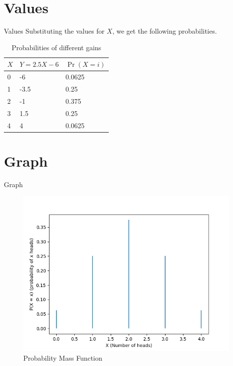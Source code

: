 \documentclass{beamer}
\providecommand{\pr}[1]{\ensuremath{\Pr\left(#1\right)}}
\begin{document}
\section{Values}
\begin{frame}{Values}
    Substituting the values for $X$, we get the following probabilities.


    \centering
    \begin{table}
    \begin{tabular}{|l|l|l|}
        \hline
        $X$ & $Y = 2.5 X - 6$ & $\pr{X = i}$ \\
        \hline
        0 & -6 & 0.0625 \\
        1 & -3.5 & 0.25 \\
        2 & -1 & 0.375 \\
        3 & 1.5 & 0.25 \\
        4 & 4 & 0.0625 \\
        \hline
    \end{tabular}
    \caption{Probabilities of different gains}
    \end{table}

\end{frame}

\section{Graph}
\begin{frame}{Graph}
    \begin{figure}[!ht]
        \includegraphics[width=\textheight]{figs/plot.png}
        \caption{Probability Mass Function}
        \label{figure:1}
    \end{figure}
\end{frame}
\end{document}
